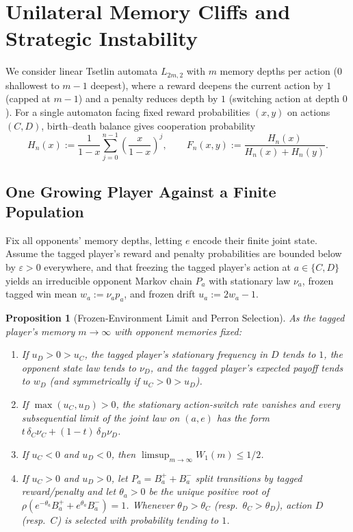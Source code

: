 \documentclass[11pt,reqno]{amsart}
\newtheorem{proposition}[theorem]{Proposition}
\theoremstyle{definition}
\theoremstyle{remark}
\begin{document}
\section{Unilateral Memory Cliffs and Strategic Instability}\label{sec:memory}

We consider linear Tsetlin automata $L_{2m,2}$ with $m$ memory depths per action ($0$ shallowest to $m-1$ deepest), where a reward deepens the current action by $1$ (capped at $m-1$) and a penalty reduces depth by $1$ (switching action at depth $0$). For a single automaton facing fixed reward probabilities $(x,y)$ on actions $(C,D)$, birth--death balance gives cooperation probability
\begin{equation}\label{eq:one-player-F}
  H_n(x) := \frac{1}{1-x}\sum_{j=0}^{n-1}\left(\frac{x}{1-x}\right)^j, \qquad
  F_n(x,y) := \frac{H_n(x)}{H_n(x) + H_n(y)}.
\end{equation}

\subsection{One Growing Player Against a Finite Population}
Fix all opponents' memory depths, letting $e$ encode their finite joint state. Assume the tagged player's reward and penalty probabilities are bounded below by $\varepsilon > 0$ everywhere, and that freezing the tagged player's action at $a \in \{C,D\}$ yields an irreducible opponent Markov chain $P_a$ with stationary law $\nu_a$, frozen tagged win mean $w_a := \nu_a p_a$, and frozen drift $u_a := 2w_a - 1$.

\begin{proposition}[Frozen-Environment Limit and Perron Selection]\label{prop:one-growing}
As the tagged player's memory $m \to \infty$ with opponent memories fixed:
\begin{enumerate}
  \item If $u_D > 0 > u_C$, the tagged player's stationary frequency in $D$ tends to $1$, the opponent state law tends to $\nu_D$, and the tagged player's expected payoff tends to $w_D$ (and symmetrically if $u_C > 0 > u_D$).
  \item If $\max(u_C, u_D) > 0$, the stationary action-switch rate vanishes and every subsequential limit of the joint law on $(a,e)$ has the form $t\,\delta_C \nu_C + (1-t)\,\delta_D \nu_D$.
  \item If $u_C < 0$ and $u_D < 0$, then $\limsup_{m\to\infty} W_1(m) \le 1/2$.
  \item If $u_C > 0$ and $u_D > 0$, let $P_a = B_a^+ + B_a^-$ split transitions by tagged reward/penalty and let $\theta_a > 0$ be the unique positive root of $\rho(e^{-\theta_a} B_a^+ + e^{\theta_a} B_a^-) = 1$. Whenever $\theta_D > \theta_C$ (resp.\ $\theta_C > \theta_D$), action $D$ (resp.\ $C$) is selected with probability tending to $1$.
\end{enumerate}
\end{proposition}
\end{document}

